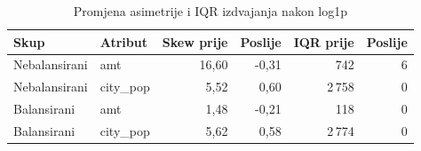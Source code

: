 \begin{table}[H]\centering
\caption{Promjena asimetrije i IQR izdvajanja nakon log1p}\label{tab:transformacije}
\small\begin{tabularx}{\linewidth}{@{}Ylrrrr@{}}\toprule
Skup & Atribut & Skew prije & Poslije & IQR prije & Poslije \\ \midrule
Nebalansirani & amt & 16,60 & -0,31 & 742 & 6 \\
Nebalansirani & city\_pop & 5,52 & 0,60 & 2\,758 & 0 \\
Balansirani & amt & 1,48 & -0,21 & 118 & 0 \\
Balansirani & city\_pop & 5,62 & 0,58 & 2\,774 & 0 \\
\bottomrule\end{tabularx}\end{table}
